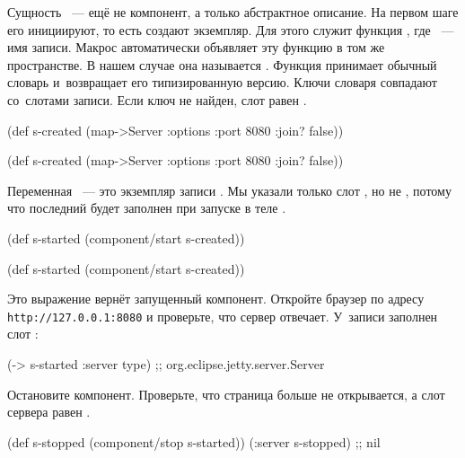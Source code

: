 Сущность ~--- ещё не компонент, а только абстрактное описание. На
первом шаге его инициируют, то есть создают экземпляр. Для этого служит функция
, где ~--- имя записи. Макрос
 автоматически объявляет эту функцию в том же пространстве. В
нашем случае она называется . Функция принимает обычный
словарь и~возвращает его типизированную версию. Ключи словаря совпадают
со~слотами записи. Если ключ не найден, слот равен .

\ifnarrow

\begin{clojure}
(def s-created
  (map->Server
    {:options {:port 8080
               :join? false}}))
\end{clojure}

\else

\begin{clojure}
(def s-created
  (map->Server {:options {:port 8080 :join? false}}))
\end{clojure}

\fi

Переменная ~--- это экземпляр записи . Мы указали
только слот , но не , потому что последний будет
заполнен при запуске в теле .

\ifnarrow

\begin{clojure}
(def s-started
  (component/start s-created))
\end{clojure}

\else

\begin{clojure}
(def s-started (component/start s-created))
\end{clojure}

\fi

Это выражение вернёт запущенный компонент. Откройте браузер по адресу
\texttt{http://127.0.0.1\-:8080} и проверьте, что сервер отвечает. У~записи
 заполнен слот :

\begin{clojure}
(-> s-started :server type)
;; org.eclipse.jetty.server.Server
\end{clojure}

Остановите компонент. Проверьте, что страница больше не открывается, а слот
сервера равен .

\ifnarrow

\begin{clojure}
(def s-stopped
  (component/stop s-started))
(:server s-stopped) ;; nil
\end{clojure}

